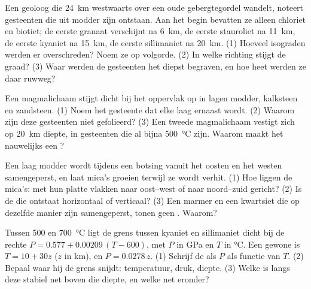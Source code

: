 \begin{exercise}[$\star\star$]\label{exo:g12:metamorphic-rocks:9}
Een geoloog die \qty{24}{km} westwaarts over een oude gebergtegordel wandelt,
noteert gesteenten die uit modder zijn ontstaan. Aan het begin bevatten ze alleen chloriet en biotiet;
de eerste granaat verschijnt na \qty{6}{km}, de eerste stauroliet na
\qty{11}{km}, de eerste kyaniet na \qty{15}{km}, de eerste sillimaniet
na \qty{20}{km}. (1) Hoeveel isograden werden er overschreden? Noem ze op volgorde.
(2) In welke richting stijgt de graad? (3) Waar werden de gesteenten het diepst
begraven, en hoe heet werden ze daar ruwweg?
\end{exercise}

\begin{exercise}[$\star\star$]\label{exo:g12:metamorphic-rocks:10}
Een magmalichaam stijgt dicht bij het oppervlak op in lagen modder, kalksteen en zandsteen. (1) Noem het gesteente dat elke laag ernaast wordt. (2) Waarom zijn deze
gesteenten niet gefolieerd? (3) Een tweede magmalichaam vestigt zich op \qty{20}{km} diepte, in
gesteenten die al bijna \qty{500}{\celsius} zijn. Waarom maakt het nauwelijks een ?
\end{exercise}

\begin{exercise}[$\star\star$]\label{exo:g12:metamorphic-rocks:11}
Een laag modder wordt tijdens een botsing vanuit het oosten en het westen samengeperst,
en laat mica's groeien terwijl ze wordt verhit. (1) Hoe liggen de mica's: met hun platte vlakken
naar oost--west of naar noord--zuid gericht? (2) Is de  die ontstaat
horizontaal of verticaal? (3) Een marmer en een kwartsiet die op dezelfde
manier zijn samengeperst, tonen geen . Waarom?
\end{exercise}

\begin{exercise}[$\star\star\star$]\label{exo:g12:metamorphic-rocks:12}
Tussen 500 en \qty{700}{\celsius} ligt de grens tussen kyaniet en sillimaniet
dicht bij de rechte $P = 0.577 + 0.00209\,(T - 600)$, met $P$ in
\unit{GPa} en $T$ in \unit{\celsius}. Een gewone  is $T = 10 + 30z$
($z$ in \unit{km}), en $P = 0.0278\,z$. (1) Schrijf de  als $P$ als
functie van $T$. (2) Bepaal waar hij de grens snijdt: temperatuur, druk,
diepte. (3) Welke  is langs deze  stabiel net boven die
diepte, en welke net eronder?
\end{exercise}

